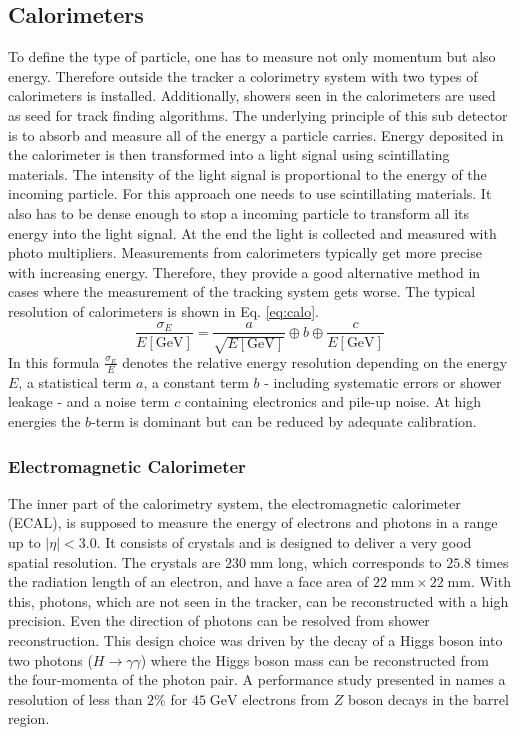 \subsection{Calorimeters}
	To define the type of particle, one has to measure not only momentum but also energy. Therefore outside the tracker a colorimetry system with two types of calorimeters is installed. Additionally, showers seen in the calorimeters are used as seed for track finding algorithms. The underlying principle of this sub detector is to absorb and measure all of the energy a particle carries. Energy deposited in the calorimeter is then transformed into a light signal using scintillating materials. The intensity of the light signal is proportional to the energy of the incoming particle. For this approach one needs to use scintillating materials. It also has to be dense enough to stop a incoming particle to transform all its energy into the light signal. At the end the light is collected and measured with photo multipliers. Measurements from calorimeters typically get more precise with increasing energy. Therefore, they provide a good alternative method in cases where the measurement of the tracking system gets worse. The typical resolution of calorimeters is shown in Eq. \ref{eq:calo}.
	\begin{equation}
	\frac{\sigma_E}{E\left[\text{GeV}\right]} = \frac{a}{\sqrt{E\left[\text{GeV}\right]}} \oplus b \oplus \frac{c}{E\left[\text{GeV}\right]}
	\label{eq:calo}
	\end{equation}
	In this formula $\frac{\sigma_E}{E}$ denotes the relative energy resolution depending on the energy $E$, a statistical term $a$, a constant term $b$ - including systematic errors or shower leakage - and a noise term $c$ containing electronics and pile-up noise. At high energies the $b$-term is dominant but can be reduced by adequate calibration. 
\subsubsection{Electromagnetic Calorimeter}
	The inner part of the calorimetry system, the electromagnetic calorimeter (ECAL), is supposed to measure the energy of electrons and photons in a range up to $|\eta| < 3.0$. It consists of  crystals and is designed to deliver a very good spatial resolution. The crystals are $230\;\text{mm}$ long, which corresponds to $25.8$ times the radiation length of an electron, and have a face area of $22\;\text{mm} \times 22\;\text{mm}$. With this, photons, which are not seen in the tracker, can be reconstructed with a high precision. Even the direction of photons can be resolved from shower reconstruction. This design choice was driven by the decay of a Higgs boson into two photons ($H\rightarrow \gamma \gamma$) where the Higgs boson mass can be reconstructed from the four-momenta of the photon pair. A performance study presented in \cite{EGammaPerformance} names a resolution of less than $2\%$ for $45\;\text{GeV}$ electrons from $Z$ boson decays in the barrel region.

